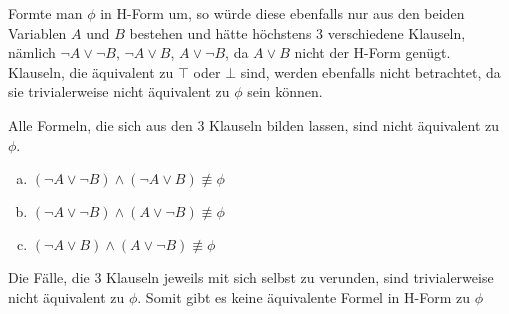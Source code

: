 \documentclass[a4paper,10pt]{article}
\begin{document}
\begin{enumerate}[(i)]
Formte man $\phi$ in H-Form um, so würde diese ebenfalls nur aus den beiden Variablen $A$ und $B$ bestehen und hätte höchstens 3 verschiedene Klauseln, nämlich $\lnot A \lor \lnot B$, $\lnot A \lor B$, $A \lor \lnot B$, da $A \lor B$ nicht der H-Form genügt. \\
Klauseln, die äquivalent zu $\top$ oder $\bot$ sind, werden ebenfalls nicht betrachtet, da sie trivialerweise nicht äquivalent zu $\phi$ sein können.

Alle Formeln, die sich aus den 3 Klauseln bilden lassen, sind nicht äquivalent zu $\phi$.

\begin{enumerate}[(a)]
\item
$(\lnot A \lor \lnot B) \land (\lnot A \lor B) \not \equiv \phi$
\item
$(\lnot A \lor \lnot B) \land (A \lor \lnot B) \not \equiv \phi$
\item
$(\lnot A \lor B) \land (A \lor \lnot B) \not \equiv \phi$
\end{enumerate}
Die Fälle, die 3 Klauseln jeweils mit sich selbst zu verunden, sind trivialerweise nicht äquivalent zu $\phi$.
Somit gibt es keine äquivalente Formel in H-Form zu $\phi$
\end{enumerate}
\end{document}
